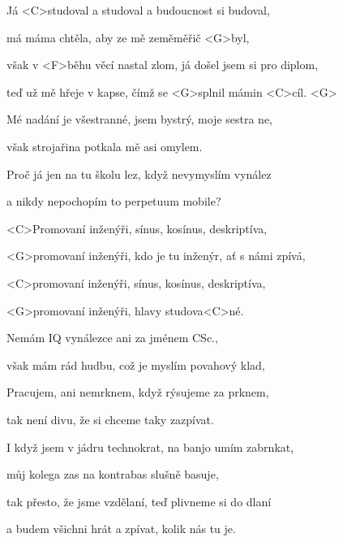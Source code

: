 

\zs
Já <C>studoval a studoval a budoucnost si budoval,

má máma chtěla, aby ze mě zeměměřič <G>byl,

však v <F>běhu věcí nastal zlom, já došel jsem si pro diplom,

teď už mě hřeje v kapse, čímž se <G>splnil mámin <C>cíl. <G>
\ks

\zs
Mé nadání je všestranné, jsem bystrý, moje sestra ne,

však strojařina potkala mě asi omylem.

Proč já jen na tu školu lez, když nevymyslím vynález

a nikdy nepochopím to perpetuum mobile?
\ks

\zr
<C>Promovaní inženýři, sínus, kosínus, deskriptíva,

<G>promovaní inženýři, kdo je tu inženýr, ať s námi zpívá,

<C>promovaní inženýři, sínus, kosínus, deskriptíva,

<G>promovaní inženýři, hlavy studova<C>né.
\kr

\zs
Nemám IQ vynálezce ani za jménem CSc.,

však mám rád hudbu, což je myslím povahový klad,

Pracujem, ani nemrknem, když rýsujeme za prknem,

tak není divu, že si chceme taky zazpívat.
\ks

\zs
I když jsem v jádru technokrat,
na banjo umím zabrnkat,

můj kolega zas na kontrabas slušně basuje,

tak přesto, že jsme vzdělaní, teď plivneme si do dlaní

a budem všichni hrát a zpívat, kolik nás tu je.
\ks

\zr \kr

\kp
